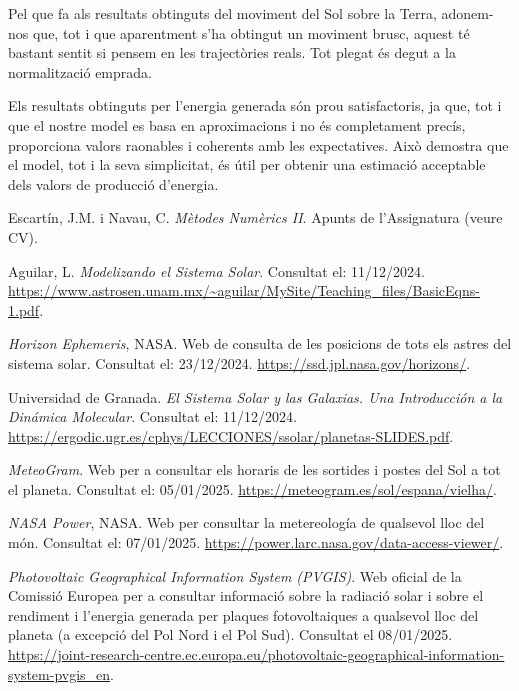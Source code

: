 \documentclass[10pt, twoside, a4paper]{article}
\begin{document}
Pel que fa als resultats obtinguts del moviment del Sol sobre la Terra, adonem-nos que, tot i que aparentment s'ha obtingut un moviment brusc, aquest té bastant sentit si pensem en les trajectòries reals. Tot plegat és degut a la normalització emprada.

Els resultats obtinguts per l'energia generada són prou satisfactoris, ja que, tot i que el nostre model es basa en aproximacions i no és completament precís, proporciona valors raonables i coherents amb les expectatives. Això demostra que el model, tot i la seva simplicitat, és útil per obtenir una estimació acceptable dels valors de producció d'energia.



\newpage
\begin{thebibliography}{99}
    Escartín, J.M. i Navau, C. \textit{Mètodes Numèrics II}. Apunts de l'Assignatura (veure CV).

    Aguilar, L. \textit{Modelizando el Sistema Solar}. Consultat el: 11/12/2024. \url{https://www.astrosen.unam.mx/~aguilar/MySite/Teaching_files/BasicEqns-1.pdf}.

    \textit{Horizon Ephemeris}, NASA. Web de consulta de les posicions de tots els astres del sistema solar. Consultat el: 23/12/2024. \url{https://ssd.jpl.nasa.gov/horizons/}.

    Universidad de Granada. \textit{El Sistema Solar y las Galaxias. Una Introducción a la Dinámica Molecular}. Consultat el: 11/12/2024. \url{https://ergodic.ugr.es/cphys/LECCIONES/ssolar/planetas-SLIDES.pdf}.

    \textit{MeteoGram}. Web per a consultar els horaris de les sortides i postes del Sol a tot el planeta. Consultat el: 05/01/2025. \url{https://meteogram.es/sol/espana/vielha/}.

    \textit{NASA Power}, NASA. Web per consultar la metereología de qualsevol lloc del món. Consultat el: 07/01/2025. \url{https://power.larc.nasa.gov/data-access-viewer/}.

    \textit{Photovoltaic Geographical Information System (PVGIS)}. Web oficial de la Comissió Europea per a consultar informació sobre la radiació solar i sobre el rendiment i l'energia generada per plaques fotovoltaiques a qualsevol lloc del planeta (a excepció del Pol Nord i el Pol Sud). Consultat el 08/01/2025. \url{https://joint-research-centre.ec.europa.eu/photovoltaic-geographical-information-system-pvgis_en}.


\end{thebibliography}
\end{document}
